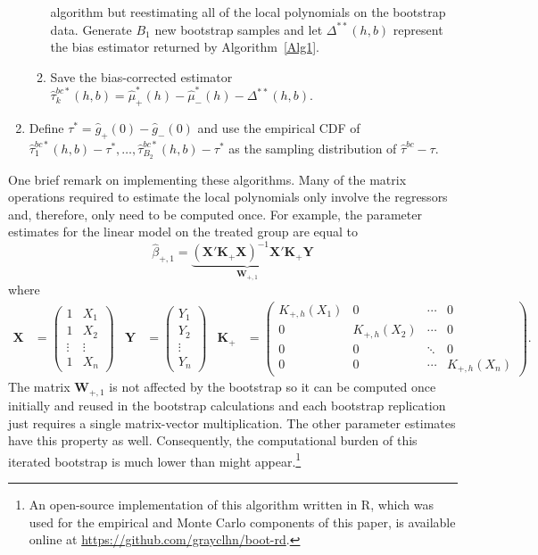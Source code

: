 \documentclass[12pt,fleqn]{article}
\begin{document}
\begin{algorithm}
\begin{enumerate}
\begin{enumerate}
      algorithm but reestimating all of the local polynomials on the bootstrap
      data. Generate $B_1$ new bootstrap samples and let $\Delta^{**}(h,b)$
      represent the bias estimator returned by Algorithm~\ref{Alg1}.
    \item Save the bias-corrected estimator
      $\hat\tau_k^{bc*}(h,b) = \hat\mu_+^*(h) - \hat\mu_-^*(h)
      - \Delta^{**}(h,b)$.
    \end{enumerate}
  \item Define $\tau^* = \hat g_+(0) - \hat g_-(0)$ and use the empirical CDF of
    $\hat\tau_1^{bc*}(h,b) - \tau^*,\dots, \hat\tau_{B_2}^{bc*}(h,b) - \tau^*$
    as the sampling distribution of $\hat \tau^{bc} - \tau$.
  \end{enumerate}
\end{algorithm}

One brief remark on implementing these algorithms. Many of the matrix operations
required to estimate the local polynomials only involve the regressors and,
therefore, only need to be computed once. For example, the parameter estimates
for the linear model on the treated group are equal to
\[
\hat\beta_{+,1} = \underbrace{(\mathbf{X}' \mathbf{K}_+ \mathbf{X})^{-1} \mathbf{X}' \mathbf{K}_+}_{\mathbf{W}_{+,1}} \mathbf{Y}
\]
where
\begin{align*}
\mathbf{X} &= \begin{pmatrix*} 1 & X_1 \\ 1 & X_2 \\ \vdots & \vdots \\ 1 & X_n \end{pmatrix*} &
\mathbf{Y} &= \begin{pmatrix*} Y_1 \\ Y_2 \\ \vdots \\ Y_n \end{pmatrix*} &
\mathbf{K}_+ &= \begin{pmatrix*}
  K_{+,h}(X_1) & 0 & \cdots & 0 \\
  0 & K_{+,h}(X_2) & \cdots & 0 \\
  0 & 0 & \ddots & 0 \\
  0 & 0 & \cdots & K_{+,h}(X_n) \end{pmatrix*}.
\end{align*}
The matrix $\mathbf{W}_{+,1}$ is not affected by the bootstrap so it can be
computed once initially and reused in the bootstrap calculations and each
bootstrap replication just requires a single matrix-vector multiplication. The
other parameter estimates have this property as well. Consequently, the
computational burden of this iterated bootstrap is much lower than might
appear.\footnote{%
  An open-source implementation of this algorithm written in R, which was used
  for the empirical and Monte Carlo components of this paper, is available
  online at \url{https://github.com/grayclhn/boot-rd}.} %
\end{document}
